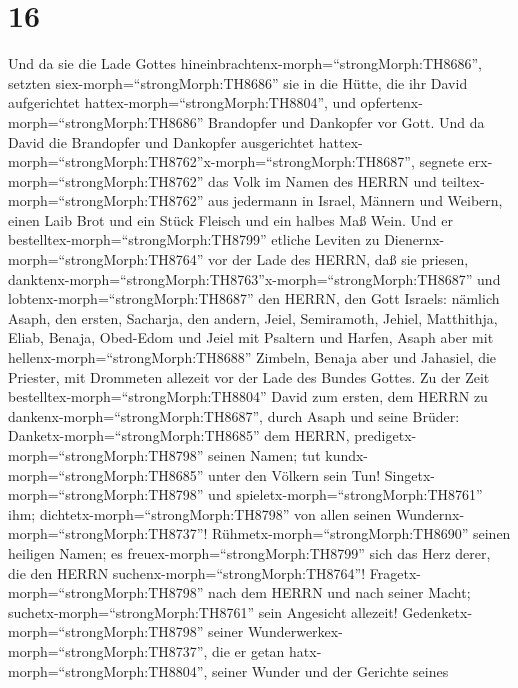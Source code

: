 \hypertarget{section-15}{%
\section{16}\label{section-15}}

 Und da sie die Lade Gottes
hineinbrachtenx-morph=``strongMorph:TH8686'', setzten
siex-morph=``strongMorph:TH8686'' sie in die Hütte, die ihr David
aufgerichtet hattex-morph=``strongMorph:TH8804'', und
opfertenx-morph=``strongMorph:TH8686'' Brandopfer und Dankopfer vor
Gott.  Und da David die Brandopfer und Dankopfer
ausgerichtet
hattex-morph=``strongMorph:TH8762''x-morph=``strongMorph:TH8687'',
segnete erx-morph=``strongMorph:TH8762'' das Volk im Namen des HERRN
 und teiltex-morph=``strongMorph:TH8762'' aus jedermann in
Israel, Männern und Weibern, einen Laib Brot und ein Stück Fleisch und
ein halbes Maß Wein.  Und er
bestelltex-morph=``strongMorph:TH8799'' etliche Leviten zu
Dienernx-morph=``strongMorph:TH8764'' vor der Lade des HERRN, daß sie
priesen,
danktenx-morph=``strongMorph:TH8763''x-morph=``strongMorph:TH8687'' und
lobtenx-morph=``strongMorph:TH8687'' den HERRN, den Gott Israels:
 nämlich Asaph, den ersten, Sacharja, den andern, Jeiel,
Semiramoth, Jehiel, Matthithja, Eliab, Benaja, Obed-Edom und Jeiel mit
Psaltern und Harfen, Asaph aber mit hellenx-morph=``strongMorph:TH8688''
Zimbeln,  Benaja aber und Jahasiel, die Priester, mit
Drommeten allezeit vor der Lade des Bundes Gottes.  Zu der
Zeit bestelltex-morph=``strongMorph:TH8804'' David zum ersten, dem HERRN
zu dankenx-morph=``strongMorph:TH8687'', durch Asaph und seine Brüder:
 Danketx-morph=``strongMorph:TH8685'' dem HERRN,
predigetx-morph=``strongMorph:TH8798'' seinen Namen; tut
kundx-morph=``strongMorph:TH8685'' unter den Völkern sein Tun!
 Singetx-morph=``strongMorph:TH8798'' und
spieletx-morph=``strongMorph:TH8761'' ihm;
dichtetx-morph=``strongMorph:TH8798'' von allen seinen
Wundernx-morph=``strongMorph:TH8737''! 
Rühmetx-morph=``strongMorph:TH8690'' seinen heiligen Namen; es
freuex-morph=``strongMorph:TH8799'' sich das Herz derer, die den HERRN
suchenx-morph=``strongMorph:TH8764''! 
Fragetx-morph=``strongMorph:TH8798'' nach dem HERRN und nach seiner
Macht; suchetx-morph=``strongMorph:TH8761'' sein Angesicht allezeit!
 Gedenketx-morph=``strongMorph:TH8798'' seiner
Wunderwerkex-morph=``strongMorph:TH8737'', die er getan
hatx-morph=``strongMorph:TH8804'', seiner Wunder und der Gerichte seines

